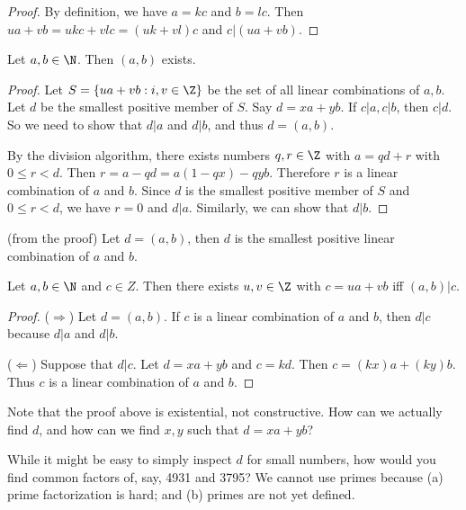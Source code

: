 \documentclass[a4paper]{article}
\begin{document}
  \begin{proof}
    By definition, we have $a = kc$ and $b = lc$. Then $ua + vb = ukc + vlc = (uk + vl)c$ and $c|(ua + vb)$.
  \end{proof}

  \begin{thm}
    Let $a,b\in \N$. Then $(a, b)$ exists.
  \end{thm}

  \begin{proof}
    Let $S=\{ua + vb:i, v\in\Z\}$ be the set of all linear combinations of $a, b$. Let $d$ be the smallest positive member of $S$. Say $d = xa + yb$. If $c|a, c|b$, then $c|d$. So we need to show that $d|a$ and $d|b$, and thus $d=(a, b)$.

    By the division algorithm, there exists numbers $q, r\in\Z$ with $a = qd + r$ with $0\leq r < d$. Then $r = a - qd = a(1 - qx) - qyb$. Therefore $r$ is a linear combination of $a$ and $b$. Since $d$ is the smallest positive member of $S$ and $0\leq r < d$, we have $r = 0$ and $d|a$. Similarly, we can show that $d|b$.
  \end{proof}

  \begin{cor}
    (from the proof) Let $d  = (a, b)$, then $d$ is the smallest positive linear combination of $a$ and $b$.
  \end{cor}

  \begin{cor}
    Let $a, b\in\N$ and $c\in Z$. Then there exists $u, v\in \Z$  with $c=ua + vb$ iff $(a, b)|c$.
  \end{cor}

  \begin{proof}
    ($\Rightarrow$) Let $d=(a, b)$. If $c$ is a linear combination of $a$ and $b$, then $d|c$ because $d|a$ and $d|b$.

    ($\Leftarrow$) Suppose that $d|c$. Let $d = xa + yb$ and $c = kd$. Then $c = (kx)a + (ky)b$. Thus $c$ is a linear combination of $a$ and $b$.
  \end{proof}

  Note that the proof above is existential, not constructive. How can we actually find $d$, and how can we find $x, y$ such that $d = xa + yb$?

  While it might be easy to simply inspect $d$ for small numbers, how would you find common factors of, say, 4931 and 3795? We cannot use primes because (a) prime factorization is hard; and (b) primes are not yet defined.
\end{document}
